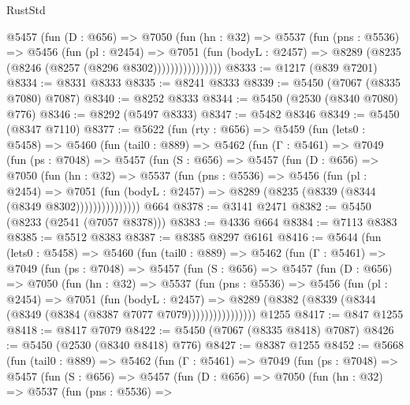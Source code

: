 \begin{lexlean}{RustStd}
\begin{coremodule}
                @5457
                  (fun (D : @656) =>
                  @7050
                    (fun (hn : @32) =>
                    @5537
                      (fun (pns : @5536) =>
                      @5456
                        (fun (pl : @2454) =>
                        @7051
                          (fun (bodyL : @2457) =>
                          @8289 (@8235 (@8246 (@8257 (@8296 @8302))))))))))))))))
@8333 := @1217 (@839 @7201)
@8334 := @8331 @8333
@8335 := @8241 @8333
@8339 := @5450 (@7067 (@8335 @7080) @7087)
@8340 := @8252 @8333
@8344 := @5450 (@2530 (@8340 @7080) @776)
@8346 := @8292 (@5497 @8333)
@8347 := @5482 @8346
@8349 := @5450 (@8347 @7110)
@8377 := @5622
    (fun (rty : @656) =>
    @5459
      (fun (lets0 : @5458) =>
      @5460
        (fun (tail0 : @889) =>
        @5462
          (fun (Γ : @5461) =>
          @7049
            (fun (ps : @7048) =>
            @5457
              (fun (S : @656) =>
              @5457
                (fun (D : @656) =>
                @7050
                  (fun (hn : @32) =>
                  @5537
                    (fun (pns : @5536) =>
                    @5456
                      (fun (pl : @2454) =>
                      @7051
                        (fun (bodyL : @2457) =>
                        @8289 (@8235 (@8339 (@8344 (@8349 @8302)))))))))))))))
    @664
@8378 := @3141 @2471
@8382 := @5450 (@8233 (@2541 (@7057 @8378)))
@8383 := @4336 @664
@8384 := @7113 @8383
@8385 := @5512 @8383
@8387 := @8385 @8297 @6161
@8416 := @5644
    (fun (lets0 : @5458) =>
    @5460
      (fun (tail0 : @889) =>
      @5462
        (fun (Γ : @5461) =>
        @7049
          (fun (ps : @7048) =>
          @5457
            (fun (S : @656) =>
            @5457
              (fun (D : @656) =>
              @7050
                (fun (hn : @32) =>
                @5537
                  (fun (pns : @5536) =>
                  @5456
                    (fun (pl : @2454) =>
                    @7051
                      (fun (bodyL : @2457) =>
                      @8289 (@8382 (@8339 (@8344 (@8349 (@8384 (@8387 @7077 @7079))))))))))))))))
    @1255
@8417 := @847 @1255
@8418 := @8417 @7079
@8422 := @5450 (@7067 (@8335 @8418) @7087)
@8426 := @5450 (@2530 (@8340 @8418) @776)
@8427 := @8387 @1255
@8452 := @5668
    (fun (tail0 : @889) =>
    @5462
      (fun (Γ : @5461) =>
      @7049
        (fun (ps : @7048) =>
        @5457
          (fun (S : @656) =>
          @5457
            (fun (D : @656) =>
            @7050
              (fun (hn : @32) =>
              @5537
                (fun (pns : @5536) =>

\end{coremodule}
\end{lexlean}

